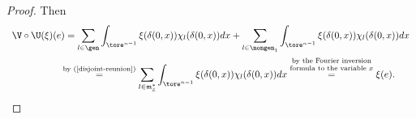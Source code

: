\begin{proof}
Then
\begin{gather*}
\V\circ \U(\xi)(e)  =  \sum_{l\in \gen} \int_{\tore^{n-1}}
\xi(\delta(0, x)) \chi_l( \delta(0, x)) dx  + \sum_{l\in \nongen_1}
\int_{\tore^{n-1}}
    \xi(\delta(0, x)) \chi_{l}(\delta(0, x))  dx\\
\hphantom{\V\circ \U(\xi)(e)}{}
 \overset{\text{by (\ref{disjoint-reunion})}}{=}
   \sum_{l\in \frak m_{\mathbb{Z}}^*} \int_{\tore^{n-1}}
\xi(\delta(0, x))
\chi_l( \delta(0, x)) dx
\overset{\mbox{\scriptsize $\begin{array}{@{}c@{}}\text{by the Fourier inversion} \\ \text{formula to the variable  $x$}\end{array}$}}{=} \xi(e). \tag*{\qed}
\end{gather*}\renewcommand{\qed}{}
\end{proof}
